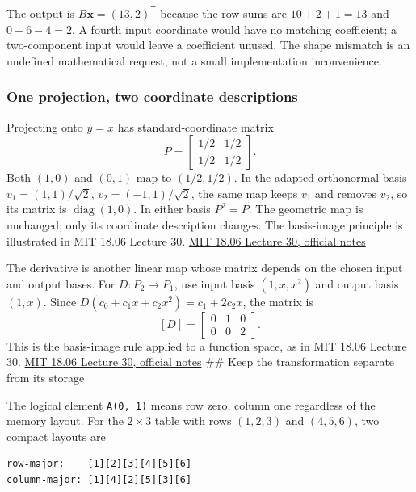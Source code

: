 The output is \(B\mathbf x=(13,2)^{\mathsf T}\) because the row sums are \(10+2+1=13\) and \(0+6-4=2\). A fourth input coordinate would have no matching coefficient; a two-component input would leave a coefficient unused. The shape mismatch is an undefined mathematical request, not a small implementation inconvenience.

\subsubsection{One projection, two coordinate descriptions}\label{01-foundations-i-ch018-one-projection-two-coordinate-descriptions}

Projecting onto \(y=x\) has standard-coordinate matrix \[
P=\begin{bmatrix}1/2&1/2\\1/2&1/2\end{bmatrix}.
\] Both \((1,0)\) and \((0,1)\) map to \((1/2,1/2)\). In the adapted orthonormal basis \(v_1=(1,1)/\sqrt2\), \(v_2=(-1,1)/\sqrt2\), the same map keeps \(v_1\) and removes \(v_2\), so its matrix is \(\operatorname{diag}(1,0)\). In either basis \(P^2=P\). The geometric map is unchanged; only its coordinate description changes. The basis-image principle is illustrated in MIT 18.06 Lecture 30. \href{https://ocw.mit.edu/courses/18-06-linear-algebra-spring-2010/71bffaffa75c005516ee010daf17868b_MIT18_06S10_L30.pdf}{MIT 18.06 Lecture 30, official notes}

The derivative is another linear map whose matrix depends on the chosen input and output bases. For \(D:P_2\to P_1\), use input basis \((1,x,x^2)\) and output basis \((1,x)\). Since \(D(c_0+c_1x+c_2x^2)=c_1+2c_2x\), the matrix is \[
[D]=\begin{bmatrix}0&1&0\\0&0&2\end{bmatrix}.
\] This is the basis-image rule applied to a function space, as in MIT 18.06 Lecture 30. \href{https://ocw.mit.edu/courses/18-06-linear-algebra-spring-2010/71bffaffa75c005516ee010daf17868b_MIT18_06S10_L30.pdf}{MIT 18.06 Lecture 30, official notes} \#\# Keep the transformation separate from its storage

The logical element \texttt{A(0,\ 1)} means row zero, column one regardless of the memory layout. For the \(2\times3\) table with rows \((1,2,3)\) and \((4,5,6)\), two compact layouts are

\begin{verbatim}
row-major:    [1][2][3][4][5][6]
column-major: [1][4][2][5][3][6]
\end{verbatim}

